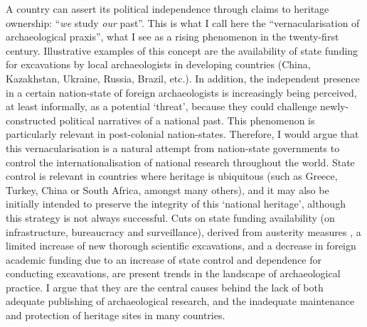        A country can assert its political independence through claims to heritage ownership: “\textit{we} study \textit{our} past”. This is what I call here the “vernacularisation of archaeological praxis”, what I see as a rising phenomenon in the twenty-first century. 
        Illustrative examples of this concept are the availability of state funding for excavations by local archaeologists in developing countries (China, Kazakhstan, Ukraine, Russia, Brazil, etc.). In addition, the independent presence in a certain nation-state of foreign archaeologists is increasingly being perceived, at least informally, as a potential ‘threat’, because they could challenge newly-constructed political narratives of a national past. This phenomenon is particularly relevant in post-colonial nation-states.
        Therefore, I would argue that this vernacularisation is a natural attempt from nation-state governments to control the internationalisation of national research throughout the world. State control is relevant in countries where heritage is ubiquitous (such as Greece, Turkey, China or South Africa, amongst many others), and it may also be initially intended to preserve the integrity of this ‘national heritage’, although this strategy is not always successful. Cuts on state funding availability (on infrastructure, bureaucracy and surveillance), derived from austerity measures \parencite{Phillips_2012}, a limited increase of new thorough scientific excavations, and a decrease in foreign academic funding due to an increase of state control and dependence for conducting excavations, are present trends in the landscape of archaeological practice. I argue that they are the central causes behind the lack of both adequate publishing of archaeological research, and the inadequate maintenance and protection of heritage sites in many countries.
		
